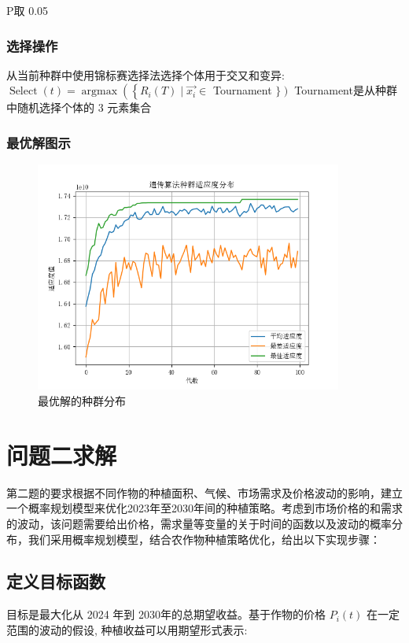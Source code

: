 \documentclass[12pt]{ctexart}
\begin{document}
	
	P取 0.05
	\subsubsection{选择操作}
	从当前种群中使用锦标赛选择法选择个体用于交又和变异:
	$\operatorname{Select}(t)=\operatorname{argmax}\left(\left\{R_i(T) \mid \overrightarrow{x_i} \in\right.\right.$ Tournament $\left.\}\right)$
	Tournament是从种群中随机选择个体的 3 元素集合
	\subsubsection{最优解图示}

\begin{figure}[h]
\centering
\includegraphics[width=0.9\textwidth]{image21.png}  %
\caption{最优解的种群分布}
\label{fig:yield_comparison1}
\end{figure}
	
	
	
	
	
	
	
	
	
	
	\section{问题二求解}  
	\label{sec:solution2}  
	第二题的要求根据不同作物的种植面积、气候、市场需求及价格波动的影响，建立一个概率规划模型来优化2023年至2030年间的种植策略。考虑到市场价格的和需求的波动，该问题需要给出价格，需求量等变量的关于时间的函数以及波动的概率分布，我们采用概率规划模型，结合农作物种植策略优化，给出以下实现步骤：
	\subsection{定义目标函数}
	目标是最大化从 2024 年到 2030年的总期望收益。基于作物的价格 $P_i(t)$
	在一定范围的波动的假设, 种植收益可以用期望形式表示:
	
\end{document}
